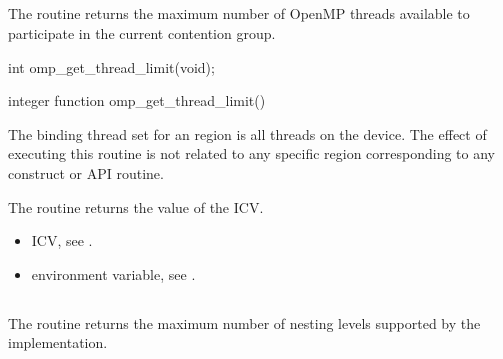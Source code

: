 \subsection{}
\label{subsec:omp_get_thread_limit}
\summary
The  routine returns the maximum number of OpenMP
threads available to participate in the current contention group.


\format
\begin{ccppspecific}
\begin{ompcFunction}
int omp_get_thread_limit(void);
\end{ompcFunction}
\end{ccppspecific}

\begin{fortranspecific}
\begin{ompfFunction}
integer function omp_get_thread_limit()
\end{ompfFunction}
\end{fortranspecific}

\binding
The binding thread set for an  region is all threads on the
device. The effect of executing this routine is not related to any specific region
corresponding to any construct or API routine.

\effect
The  routine returns the value of the  ICV.

\crossreferences
\begin{itemize}
\item {} ICV, see
.

\item {} environment variable, see
.
\end{itemize}








\subsection{}
\label{subsec:omp_get_max_active_levels_supported}

\summary
The  routine returns the maximum
number of nesting levels supported by the implementation.

